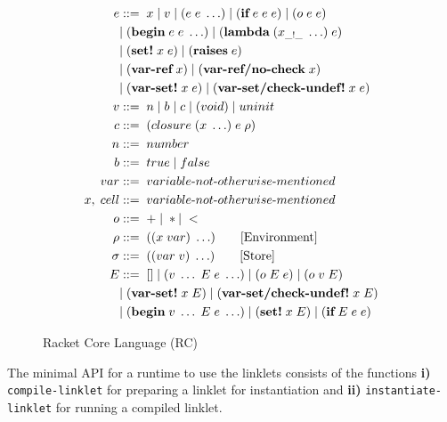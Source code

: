 \documentclass[sigplan,screen,anonymous]{acmart}
\def\dash {\text{-}}
\begin{document}
\begin{figure}[tbp]
  \begin{align*}
    e &::=\; x\; |\; v\; |\; (e\; e\; \ldots)\; |\; (\textbf{if}\; e\; e\; e)\; |\; (o\; e\; e)\; \\
    \; &|\; (\textbf{begin}\; e\; e\; \ldots)\; |\; (\textbf{lambda}\; (x_{\_!\_}\; \ldots)\; e)\\
    \; &|\; (\textbf{set!}\; x\; e)\; |\; (\textbf{raises}\; e)\\
    \; &|\; (\textbf{var\dash ref}\; x)\; |\; (\textbf{var\dash ref/no\dash check}\; x) \\
    \; &|\; (\textbf{var\dash set!}\; x\; e)\; |\; (\textbf{var\dash set/check\dash undef!}\; x\; e) \\
    v   &::=\; n\; |\; b\; |\; c\; |\; (void)\;|\; uninit \\ %
    c   &::=\; (closure\; (x\; \ldots)\; e\; \rho) \\
    n   &::=\; number \\
    b   &::=\; true\; |\; false \\
    var &::=\; variable\dash not\dash otherwise\dash mentioned \\ %
    x,\; cell &::=\; variable\dash not\dash otherwise\dash mentioned \\ %
    o  &::=\; +\; |\; * |\; < \\
    \rho   &::=\; ((x\; var)\; \ldots) \tag*{[Environment]}\\
    \sigma   &::=\; ((var\; v)\; \ldots) \tag*{[Store]}\\
    E   &::=\; []\; |\; (v\; \ldots\; E\; e\; \ldots)\; |\; (o\; E\; e)\; |\; (o\; v\; E) \\
    \;  &|\; (\textbf{var\dash set!}\; x\; E)\; |\; (\textbf{var\dash set/check\dash undef!}\; x\; E) \\
    \;  &|\; (\textbf{begin}\; v\; \ldots\; E\; e\; \ldots)\; |\; (\textbf{set!}\; x\; E)\; |\; (\textbf{if}\; E\; e\; e)
  \end{align*}
  \caption{Racket Core Language (RC)}
  \label{fig:racket-source}
\end{figure}

The minimal API for a runtime to use the linklets consists of the
functions \textbf{i)} \verb|compile-linklet| for preparing a linklet
for instantiation and \textbf{ii)} \verb|instantiate-linklet| for
running a compiled linklet.

\def\la {\bm{L_\alpha}}
\def\lb {\bm{L_\beta}}
\end{document}
